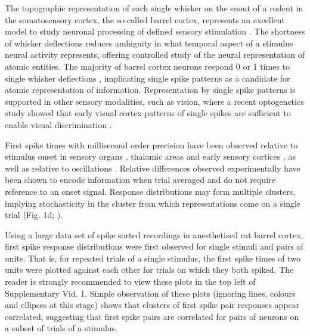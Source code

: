 \documentclass{article}
\begin{document}
The topographic representation of each single whisker on the snout of a rodent in the somatosensory cortex, the so-called barrel cortex, represents an excellent model to study neuronal processing of defined sensory stimulation \cite{feldmeyer2013barrel}. The shortness of whisker deflections reduces ambiguity in what temporal aspect of a stimulus neural activity represents, offering controlled study of the neural representation of atomic entities. The majority of barrel cortex neurons respond 0 or 1 times to single whisker deflections \cite{reyes2014laminar}, implicating single spike patterns as a candidate for atomic representation of information. Representation by single spike patterns is supported in other sensory modalities, such as vision, where a recent optogenetics study showed that early visual cortex patterns of single spikes are sufficient to enable visual discrimination \cite{resulaj2018first}.

First spike times with millisecond order precision have been observed relative to stimulus onset in sensory organs \cite{johansson2004first, uzzell2004precision, gollisch2008rapid}, thalamic areas \cite{reinagel2002precise, storchi2012comparison} and early sensory cortices \cite{reyes2014laminar}, as well as relative to oscillations \cite{havenith2011synchrony}. Relative differences \cite{izhikevich2006polychronization} observed experimentally \cite{johansson2004first, gollisch2008rapid, reyes2014laminar} have been shown to encode information when trial averaged \cite{gollisch2008rapid} and do not require reference to an onset signal.
Response distributions may form multiple clusters, implying stochasticity in the cluster from which representations come on a single trial (Fig. 1d; \cite{reyes2014laminar}).

Using a large data set of spike sorted recordings in anesthetized rat barrel cortex, first spike response distributions were first observed for single stimuli and pairs of units. That is, for repeated trials of a single stimulus, the first spike times of two units were plotted against each other for trials on which they both spiked. The reader is strongly recommended to view these plots in the top left of Supplementary Vid. 1. Simple observation of these plots (ignoring lines, colours and ellipses at this stage) shows that clusters of first spike pair responses appear correlated, suggesting that first spike pairs are correlated for pairs of neurons on a subset of trials of a stimulus. 
\end{document}
